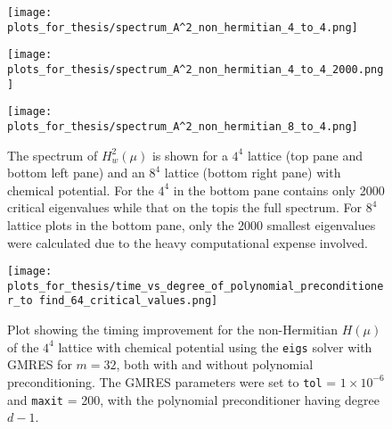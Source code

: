 \begin{figure}[H]
    \centering
    \begin{minipage}{0.9\textwidth} %
        \centering
        \texttt{[image: plots\_for\_thesis/spectrum\_A^2\_non\_hermitian\_4\_to\_4.png]} %
    \end{minipage}

    \vspace{0.02\textwidth} %

    \begin{minipage}{0.45\textwidth}
        \centering
        \texttt{[image: plots\_for\_thesis/spectrum\_A^2\_non\_hermitian\_4\_to\_4\_2000.png]} %
    \end{minipage}%
    \hspace{0.02\textwidth} %
    \begin{minipage}{0.45\textwidth}
        \centering
        \texttt{[image: plots\_for\_thesis/spectrum\_A^2\_non\_hermitian\_8\_to\_4.png]} %
    \end{minipage}
    \caption{\small The spectrum of $H_w^2(\mu)$ is shown for a $4^4$ lattice (top pane and bottom left pane) and an $8^4$ lattice (bottom right pane) with chemical potential. For the $4^4$ in the bottom pane contains only 2000 critical eigenvalues while that on the topis the full spectrum. For $8^4$ lattice plots in the bottom pane, only the 2000 smallest eigenvalues were calculated due to the heavy computational expense involved.}
    \label{fig:spectrum_A^2}
\end{figure}

\begin{figure}[H]
    \centering
    \texttt{[image: plots\_for\_thesis/time\_vs\_degree\_of\_polynomial\_preconditioner\_to find\_64\_critical\_values.png]}
    \caption{\small Plot showing the timing improvement for the non-Hermitian $H(\mu)$ of the $4^4$ lattice with chemical potential using the \texttt{eigs} solver with GMRES for $m=32$, both with and without polynomial preconditioning. The GMRES parameters were set to \texttt{tol} = $1 \times 10^{-6}$ and \texttt{maxit} = 200, with the polynomial preconditioner having degree $d-1$.}
    \label{fig:crit_eigenvalue_time_degree_of_poly_precond} %
\end{figure}

